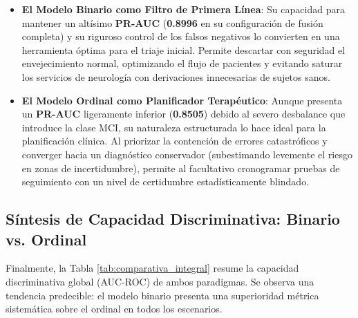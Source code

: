 \documentclass[12pt, oneside, english, spanish]{book}
\begin{document}
\begin{itemize}
	\item \textbf{El Modelo Binario como Filtro de Primera Línea}: Su capacidad para mantener un altísimo \textbf{PR-AUC} (\textbf{0.8996} en su configuración de fusión completa) y su riguroso control de los falsos negativos lo convierten en una herramienta óptima para el triaje inicial. Permite descartar con seguridad el envejecimiento normal, optimizando el flujo de pacientes y evitando saturar los servicios de neurología con derivaciones innecesarias de sujetos sanos.
	\item \textbf{El Modelo Ordinal como Planificador Terapéutico}: Aunque presenta un \textbf{PR-AUC} ligeramente inferior (\textbf{0.8505}) debido al severo desbalance que introduce la clase MCI, su naturaleza estructurada lo hace ideal para la planificación clínica. Al priorizar la contención de errores catastróficos y converger hacia un diagnóstico conservador (subestimando levemente el riesgo en zonas de incertidumbre), permite al facultativo cronogramar pruebas de seguimiento con un nivel de certidumbre estadísticamente blindado.
\end{itemize}

\subsection{Síntesis de Capacidad Discriminativa: Binario vs. Ordinal} \label{subsec:res_sintesis_discriminativa}

Finalmente, la Tabla \ref{tab:comparativa_integral} resume la capacidad discriminativa global (AUC-ROC) de ambos paradigmas. Se observa una tendencia predecible: el modelo binario presenta una superioridad métrica sistemática sobre el ordinal en todos los escenarios.
\end{document}
